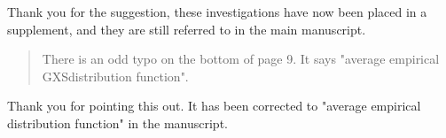 \documentclass[12pt]{article}
\newenvironment{comment}%
{\begin{quotation}\noindent\small\it\color{darkblue}\ignorespaces%
}{\end{quotation}}
\begin{document}
Thank you for the suggestion, these investigations have now been placed in a supplement, and they are still referred to in
the main manuscript.

\begin{comment}
There is an odd typo on the bottom of page 9. It says "average empirical GXSdistribution function".
\end{comment}

Thank you for pointing this out. It has been
corrected to "average empirical distribution function" in the manuscript.





\end{document}

